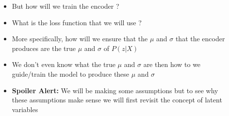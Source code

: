 \begin{frame}
	\begin{columns}
		\begin{overlayarea}{\textwidth}{\textheight}
			\vspace{3pt}
			
		\end{overlayarea}
		\begin{overlayarea}{\textwidth}{\textheight}
			\begin{itemize}\justifying
				\item<1-> But how will we train the encoder ?
				\item<2-> What is the loss function that we will use ?
				\item<3-> More specifically, how will we ensure that the $\mu$ and $\sigma$ that the encoder produces are the true $\mu$ and $\sigma$ of $P(z|X)$
				\item<4-> We don't even know what the true $\mu$ and $\sigma$ are then how to we guide/train the model to produce these $\mu$ and $\sigma$
				\item<5-> \textbf{Spoiler Alert:} We will be making some assumptions but to see why these assumptions make sense we will first revisit the concept of latent variables
			\end{itemize}
		\end{overlayarea}
	\end{columns}
\end{frame}


